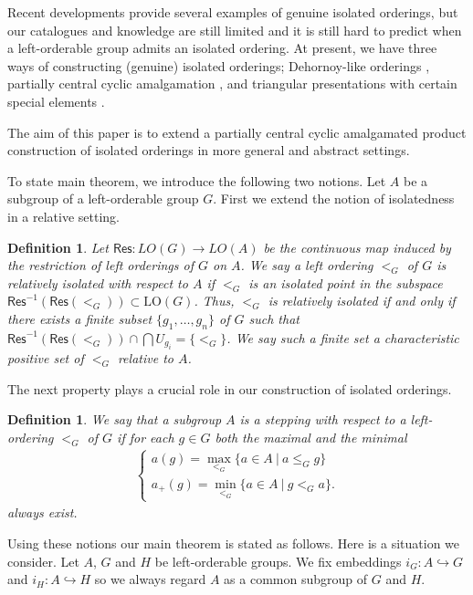 \documentclass[10pt]{amsart}
\newtheorem{definition}[theorem]{Definition}}
\numberwithin{equation}{section}
\begin{document}
Recent developments provide several examples of genuine isolated orderings, but our catalogues and knowledge are still limited and it is still hard to predict when a left-orderable group admits an isolated ordering. At present, we have three ways of constructing (genuine) isolated orderings; Dehornoy-like orderings \cite{i1,n2}, partially central cyclic amalgamation \cite{i2}, and triangular presentations with certain special elements \cite{de}. 

The aim of this paper is to extend a partially central cyclic amalgamated product construction of isolated orderings \cite{i2} in more general and abstract settings. 

To state main theorem, we introduce the following two notions.
Let $A$ be a subgroup of a left-orderable group $G$.
First we extend the notion of isolatedness in a relative setting.

\begin{definition} 
Let $\textsf{Res}:LO(G)\rightarrow LO(A)$ be the continuous map induced by the restriction of left orderings of $G$ on $A$. We say a left ordering $<_{G}$ of $G$  is \emph{relatively isolated} with respect to $A$ if $<_{G}$ is an isolated point in the subspace $\textsf{Res}^{-1}(\textsf{Res} (<_{G})) \subset {\textrm{LO}}(G)$. Thus, $<_{G}$ is relatively isolated if and only if there exists a finite subset $\{g_1,\ldots,g_{n}\}$ of $G$ such that $\textsf{Res}^{-1}(\textsf{Res} (<_{G})) \cap \bigcap U_{g_i} =\{<_{G}\}$. We say such a finite set a \emph{characteristic positive set} of $<_{G}$ relative to $A$.
\end{definition}

The next property plays a crucial role in our construction of isolated orderings. 

\begin{definition}
We say that a subgroup $A$ is a \emph{stepping} with respect to a left-ordering $<_{G}$ of $G$ if for each $g \in G$ both the maximal and the minimal
\begin{gather*}
\begin{cases}
a(g)= \max_{<_{G}}\{a \in A \: | \: a\leq_{G} g\} \\  
a_{+}(g)= \min_{<_{G}}\{a \in A \: | \: g <_{G} a\}.
\end{cases}
\end{gather*}
always exist. 
\end{definition}

Using these notions our main theorem is stated as follows.
Here is a situation we consider. Let $A$, $G$ and $H$ be left-orderable groups. 
We fix embeddings $i_{G}: A \hookrightarrow G$ and $i_{H}: A \hookrightarrow H$ so we always regard $A$ as a common subgroup of $G$ and $H$.
\end{document}
